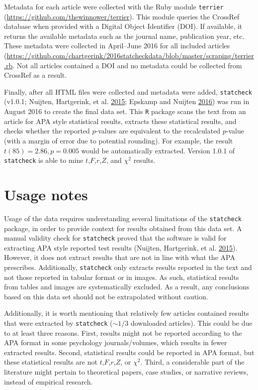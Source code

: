 \documentclass[a5paper]{book}
\begin{document}
Metadata for each article were collected with the Ruby module
\texttt{terrier} (\url{https://github.com/thewinnower/terrier}). This
module queries the CrossRef database when provided with a Digital Object
Identifier (DOI). If available, it returns the available metadata such
as the journal name, publication year, etc. These metadata were
collected in April--June 2016 for all included articles
(\url{https://github.com/chartgerink/2016statcheckdata/blob/master/scraping/terrier.rb}.
Not all articles contained a DOI and no metadata could be collected from
CrossRef as a result.

Finally, after all HTML files were collected and metadata were added,
\texttt{statcheck} (v1.0.1; Nuijten, Hartgerink, et al.
\protect\hyperlink{ref-doi:10.3758ux2fs13428-015-0664-2}{2015}; Epskamp
and Nuijten \protect\hyperlink{ref-statcheck}{2016}) was run in August
2016 to create the final data set. This \texttt{R} package scans the
text from an article for APA style statistical results, extracts these
statistical results, and checks whether the reported \(p\)-values are
equivalent to the recalculated \(p\)-value (with a margin of error due
to potential rounding). For example, the result \(t(85)=2.86,p=0.005\)
would be automatically extracted. Version 1.0.1 of \texttt{statcheck} is
able to mine \(t\),\(F\),\(r\),\(Z\), and \(\chi^2\) results.

\section{Usage notes}\label{usage-notes}

Usage of the data requires understanding several limitations of the
\texttt{statcheck} package, in order to provide context for results
obtained from this data set. A manual validity check for
\texttt{statcheck} proved that the software is valid for extracting APA
style reported test results (Nuijten, Hartgerink, et al.
\protect\hyperlink{ref-doi:10.3758ux2fs13428-015-0664-2}{2015}).
However, it does not extract results that are not in line with what the
APA prescribes. Additionally, \texttt{statcheck} only extracts results
reported in the text and not those reported in tabular format or in
images. As such, statistical results from tables and images are
systematically excluded. As a result, any conclusions based on this data
set should not be extrapolated without caution.

Additionally, it is worth mentioning that relatively few articles
contained results that were extracted by \texttt{statcheck} (\(\sim1/3\)
downloaded articles). This could be due to at least three reasons.
First, results might not be reported according to the APA format in some
psychology journals/volumes, which results in fewer extracted results.
Second, statistical results could be reported in APA format, but these
statistical results are not \(t\),\(F\),\(r\),\(Z\), or \(\chi^2\).
Third, a considerable part of the literature might pertain to
theoretical papers, case studies, or narrative reviews, instead of
empirical research.
\end{document}
